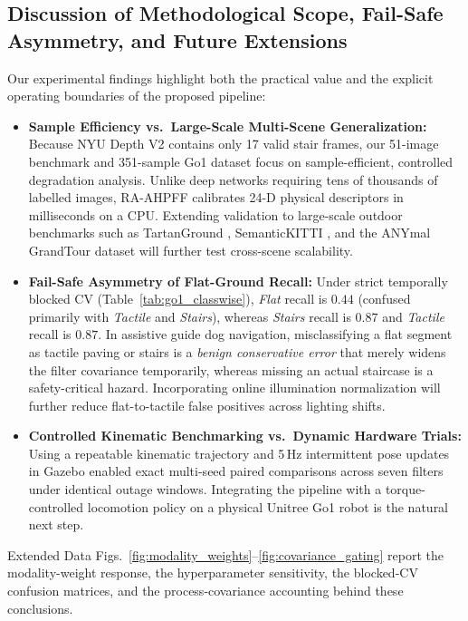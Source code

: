 \documentclass[11pt, a4paper]{article}
\begin{document}
\subsection{Discussion of Methodological Scope, Fail-Safe Asymmetry, and Future Extensions}
\label{subsec:discussion}
Our experimental findings highlight both the practical value and the explicit operating boundaries of the proposed pipeline:
\begin{itemize}
    \item \textbf{Sample Efficiency vs.\ Large-Scale Multi-Scene Generalization:} Because NYU Depth V2 contains only 17 valid stair frames, our 51-image benchmark and 351-sample Go1 dataset focus on sample-efficient, controlled degradation analysis. Unlike deep networks requiring tens of thousands of labelled images, RA-AHPFF calibrates 24-D physical descriptors in milliseconds on a CPU. Extending validation to large-scale outdoor benchmarks such as TartanGround \cite{tartanground2025}, SemanticKITTI \cite{behley2019semantickitti}, and the ANYmal GrandTour dataset \cite{grandtour2026} will further test cross-scene scalability.
    \item \textbf{Fail-Safe Asymmetry of Flat-Ground Recall:} Under strict temporally blocked CV (Table~\ref{tab:go1_classwise}), \textit{Flat} recall is $0.44$ (confused primarily with \textit{Tactile} and \textit{Stairs}), whereas \textit{Stairs} recall is $0.87$ and \textit{Tactile} recall is $0.87$. In assistive guide dog navigation, misclassifying a flat segment as tactile paving or stairs is a \textit{benign conservative error} that merely widens the filter covariance temporarily, whereas missing an actual staircase is a safety-critical hazard. Incorporating online illumination normalization will further reduce flat-to-tactile false positives across lighting shifts.
    \item \textbf{Controlled Kinematic Benchmarking vs.\ Dynamic Hardware Trials:} Using a repeatable kinematic trajectory and 5\,Hz intermittent pose updates in Gazebo enabled exact multi-seed paired comparisons across seven filters under identical outage windows. Integrating the pipeline with a torque-controlled locomotion policy on a physical Unitree Go1 robot is the natural next step.
\end{itemize}

Extended Data Figs.~\ref{fig:modality_weights}--\ref{fig:covariance_gating} report the modality-weight response, the hyperparameter sensitivity, the blocked-CV confusion matrices, and the process-covariance accounting behind these conclusions.
\end{document}
